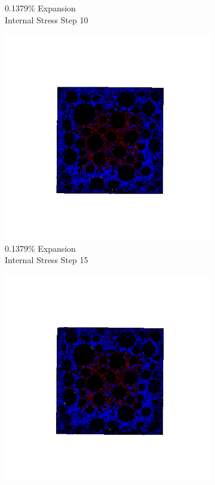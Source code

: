 \begin{figure}[ht!]
\begin{subfigure}{.25\textwidth}
      \caption{0.1379\% Expansion\\Internal Stress Step 10}
    \end{subfigure}%
    \begin{subfigure}{.25\textwidth}
      \centering
      \includegraphics[width=1.0\linewidth]{Files/exp_3D/DEF/A30X0C_1_s15.png}
      \caption{0.1379\% Expansion\\Internal Stress Step 15}
    \end{subfigure}%
    \begin{subfigure}{.25\textwidth}
      \centering
      \includegraphics[width=1.0\linewidth]{Files/exp_3D/DEF/A30X0C_1_stress.png}

\end{subfigure}
\end{figure}
